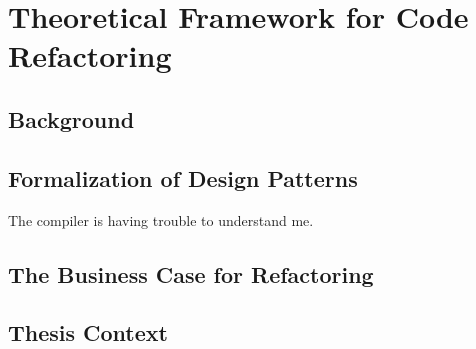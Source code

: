 \chapter{Theoretical Framework for Code Refactoring}

\section{Background}
\section{Formalization of Design Patterns}
The compiler is having trouble to understand me.
\section{The Business Case for Refactoring}
\section{Thesis Context}
